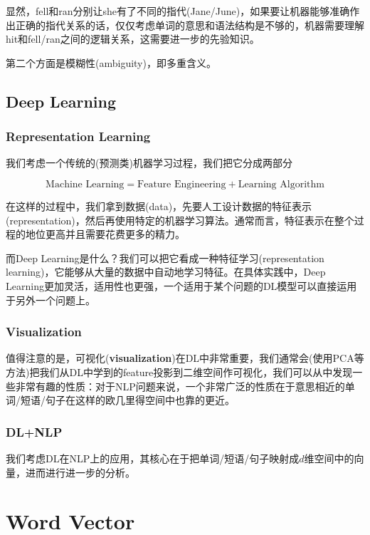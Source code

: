 \documentclass{article}
\begin{document}
显然，fell和ran分别让she有了不同的指代(Jane/June)，如果要让机器能够准确作出正确的指代关系的话，仅仅考虑单词的意思和语法结构是不够的，机器需要理解hit和fell/ran之间的逻辑关系，这需要进一步的先验知识。

第二个方面是模糊性(ambiguity)，即多重含义。

\subsection{Deep Learning}

\subsubsection*{Representation Learning}

我们考虑一个传统的(预测类)机器学习过程，我们把它分成两部分

$$\text{Machine Learning} = \text{Feature Engineering}+\text{Learning Algorithm}$$

在这样的过程中，我们拿到数据(data)，先要人工设计数据的特征表示(representation)，然后再使用特定的机器学习算法。通常而言，特征表示在整个过程的地位更高并且需要花费更多的精力。

而Deep Learning是什么？我们可以把它看成一种特征学习(representation learning)，它能够从大量的数据中自动地学习特征。在具体实践中，Deep Learning更加灵活，适用性也更强，一个适用于某个问题的DL模型可以直接运用于另外一个问题上。

\subsubsection*{Visualization}

值得注意的是，可视化(\textbf{visualization})在DL中非常重要，我们通常会(使用PCA等方法)把我们从DL中学到的feature投影到二维空间作可视化，我们可以从中发现一些非常有趣的性质：对于NLP问题来说，一个非常广泛的性质在于意思相近的单词/短语/句子在这样的欧几里得空间中也靠的更近。

\subsubsection*{DL+NLP}

我们考虑DL在NLP上的应用，其核心在于把单词/短语/句子映射成$d$维空间中的向量，进而进行进一步的分析。

\section{Word Vector}
\end{document}
